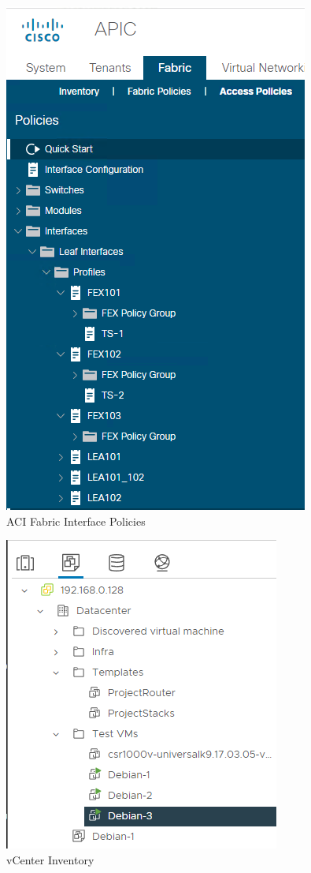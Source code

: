 \begin{figure}[H]
    \centering
    \includegraphics[scale=1.2]{images/aci-empty-interface-policy.png}
    \caption{ACI Fabric Interface Policies}
    \label{fig:aci-empty-interface-policy}
\end{figure}

\begin{figure}[H]
    \centering
    \includegraphics[scale=1.2]{images/empty-vcenter.png}
    \caption{vCenter Inventory}
    \label{fig:empty-vcenter}
\end{figure}
